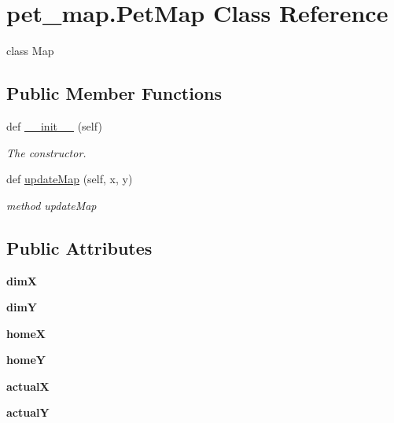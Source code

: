 \hypertarget{classpet__map_1_1PetMap}{}\section{pet\+\_\+map.\+Pet\+Map Class Reference}
\label{classpet__map_1_1PetMap}


class Map  


\subsection*{Public Member Functions}
\begin{DoxyCompactItemize}
\item 
def \hyperlink{classpet__map_1_1PetMap_a8235a0010f925e43233c2133291c5f62}{\+\_\+\+\_\+init\+\_\+\+\_\+} (self)
\begin{DoxyCompactList}\small\item\em The constructor. \end{DoxyCompactList}\item 
def \hyperlink{classpet__map_1_1PetMap_a98a355ec64fdefbf2ff773d7904995d1}{update\+Map} (self, x, y)
\begin{DoxyCompactList}\small\item\em method update\+Map \end{DoxyCompactList}\end{DoxyCompactItemize}
\subsection*{Public Attributes}
\begin{DoxyCompactItemize}
\item 
\mbox{\label{classpet__map_1_1PetMap_ab383dd014e2cb6fc75d2f19187f9c4df}} 
{\bfseries dimX}
\item 
\mbox{\label{classpet__map_1_1PetMap_a138655b51dc4292b6426228df9cb951b}} 
{\bfseries dimY}
\item 
\mbox{\label{classpet__map_1_1PetMap_a1f2cb698135b8ba1ab7fe412a7a49276}} 
{\bfseries homeX}
\item 
\mbox{\label{classpet__map_1_1PetMap_a83c61ed1b1e7ec7ef258e745b3138a3f}} 
{\bfseries homeY}
\item 
\mbox{\label{classpet__map_1_1PetMap_a9034a42582a94ad1075c446b8172403a}} 
{\bfseries actualX}
\item 
\mbox{\label{classpet__map_1_1PetMap_a5f859151207f6bd78a8f269e522963f2}} 
{\bfseries actualY}
\end{DoxyCompactItemize}


